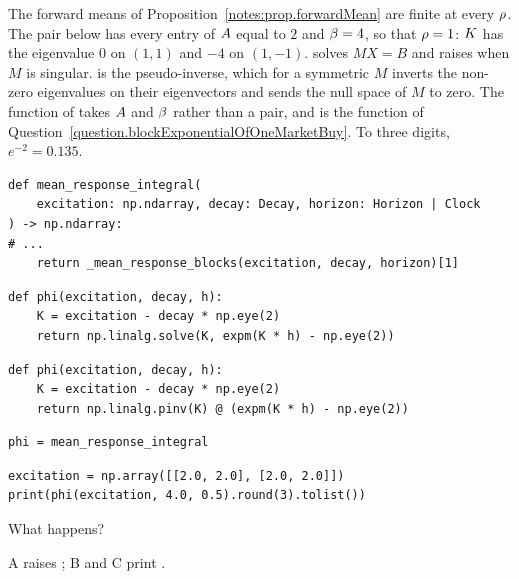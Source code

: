 \begin{question}
\label{question.integralOfTheResponseAtTheCriticalPoint}
The forward means of Proposition~\ref{notes:prop.forwardMean} are finite at every $\rho$.
The pair below has every entry of $A$ equal to $2$ and $\beta = 4$,
so that $\rho = 1$:
$K$ has the eigenvalue $0$ on $(1, 1)$ and $-4$ on $(1, -1)$.
 solves $MX = B$
and raises  when $M$ is singular.
 is the pseudo-inverse,
which for a symmetric $M$ inverts the non-zero eigenvalues on their eigenvectors
and sends the null space of $M$ to zero.
The function  of 
takes $A$ and $\beta$ rather than a pair,
and  is the function of
Question~\ref{question.blockExponentialOfOneMarketBuy}.
To three digits, $e^{-2} = 0.135$.
\begin{lstlisting}[caption={\protect\codehl{unito26.lob.hawkes.mean\_response\_integral}, its docstring elided.}, label=listing.meanResponseIntegralFunction]
def mean_response_integral(
    excitation: np.ndarray, decay: Decay, horizon: Horizon | Clock
) -> np.ndarray:
# ...
    return _mean_response_blocks(excitation, decay, horizon)[1]
\end{lstlisting}
\begin{lstlisting}[caption={Alternative A}, label=listing.criticalPhiA]
def phi(excitation, decay, h):
    K = excitation - decay * np.eye(2)
    return np.linalg.solve(K, expm(K * h) - np.eye(2))
\end{lstlisting}
\begin{lstlisting}[caption={Alternative B}, label=listing.criticalPhiB]
def phi(excitation, decay, h):
    K = excitation - decay * np.eye(2)
    return np.linalg.pinv(K) @ (expm(K * h) - np.eye(2))
\end{lstlisting}
\begin{lstlisting}[caption={Alternative C}, label=listing.criticalPhiC]
phi = mean_response_integral
\end{lstlisting}
\begin{lstlisting}[caption={Run once with each alternative}, label=listing.criticalPhiRun]
excitation = np.array([[2.0, 2.0], [2.0, 2.0]])
print(phi(excitation, 4.0, 0.5).round(3).tolist())
\end{lstlisting}
What happens?
\begin{choices}
 \choice A raises ;
  B and C print \codehl{[[0.358, 0.142], [0.142, 0.358]]}.

\end{choices}
\end{question}
